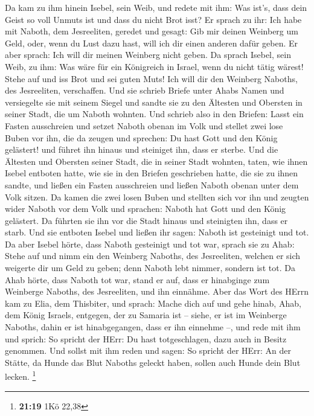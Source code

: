  Da kam zu ihm hinein Isebel, sein Weib, und redete mit ihm:
Was ist's, dass dein Geist so voll Unmuts ist und dass du nicht Brot
isst?  Er sprach zu ihr: Ich habe mit Naboth, dem
Jesreeliten, geredet und gesagt: Gib mir deinen Weinberg um Geld, oder,
wenn du Lust dazu hast, will ich dir einen anderen dafür geben. Er aber
sprach: Ich will dir meinen Weinberg nicht geben.  Da sprach
Isebel, sein Weib, zu ihm: Was wäre für ein Königreich in Israel, wenn
du nicht tätig wärest! Stehe auf und iss Brot und sei guten Muts! Ich
will dir den Weinberg Naboths, des Jesreeliten, verschaffen.
 Und sie schrieb Briefe unter Ahabs Namen und versiegelte
sie mit seinem Siegel und sandte sie zu den Ältesten und Obersten in
seiner Stadt, die um Naboth wohnten.  Und schrieb also in
den Briefen: Lasst ein Fasten ausschreien und setzet Naboth obenan im
Volk  und stellet zwei lose Buben vor ihn, die da zeugen
und sprechen: Du hast Gott und den König gelästert! und führet ihn
hinaus und steiniget ihn, dass er sterbe.  Und die Ältesten
und Obersten seiner Stadt, die in seiner Stadt wohnten, taten, wie ihnen
Isebel entboten hatte, wie sie in den Briefen geschrieben hatte, die sie
zu ihnen sandte,  und ließen ein Fasten ausschreien und
ließen Naboth obenan unter dem Volk sitzen.  Da kamen die
zwei losen Buben und stellten sich vor ihn und zeugten wider Naboth vor
dem Volk und sprachen: Naboth hat Gott und den König gelästert. Da
führten sie ihn vor die Stadt hinaus und steinigten ihn, dass er starb.
 Und sie entboten Isebel und ließen ihr sagen: Naboth ist
gesteinigt und tot.  Da aber Isebel hörte, dass Naboth
gesteinigt und tot war, sprach sie zu Ahab: Stehe auf und nimm ein den
Weinberg Naboths, des Jesreeliten, welchen er sich weigerte dir um Geld
zu geben; denn Naboth lebt nimmer, sondern ist tot.  Da
Ahab hörte, dass Naboth tot war, stand er auf, dass er hinabginge zum
Weinberge Naboths, des Jesreeliten, und ihn einnähme.  Aber
das Wort des HErrn kam zu Elia, dem Thisbiter, und sprach: 
Mache dich auf und gehe hinab, Ahab, dem König Israels, entgegen, der zu
Samaria ist -- siehe, er ist im Weinberge Naboths, dahin er ist
hinabgegangen, dass er ihn einnehme --,  und rede mit ihm
und sprich: So spricht der HErr: Du hast totgeschlagen, dazu auch in
Besitz genommen. Und sollst mit ihm reden und sagen: So spricht der
HErr: An der Stätte, da Hunde das Blut Naboths geleckt haben, sollen
auch Hunde dein Blut lecken. \footnote{\textbf{21:19} 1Kö 22,38}
